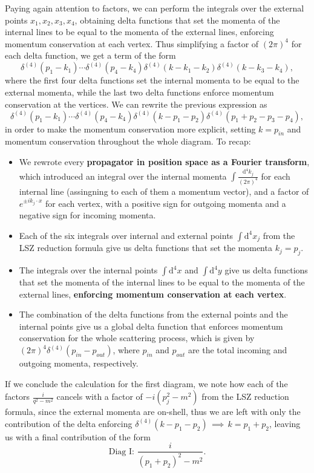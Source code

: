 Paying again attention to factors, we can perform the integrals over the external points \(x_1, x_2, x_3, x_4\), obtaining delta functions that set the momenta of the internal lines to be equal to the momenta of the external lines, enforcing momentum conservation at each vertex. Thus simplifying a factor of \((2\pi)^4\) for each delta function, we get a term of the form
\[
    \delta^{(4)}(p_1 - k_1) \cdots \delta^{(4)}(p_4 - k_4) \delta^{(4)}(k - k_1 - k_2) \delta^{(4)}(k - k_3 - k_4),
\]
where the first four delta functions set the internal momenta to be equal to the external momenta, while the last two delta functions enforce momentum conservation at the vertices. We can rewrite the previous expression as
\[
    \delta^{(4)}(p_1 - k_1) \cdots \delta^{(4)}(p_4 - k_4) \delta^{(4)}(k - p_1 - p_2) \delta^{(4)}(p_1 + p_2 - p_3 - p_4),
\]
in order to make the momentum conservation more explicit, setting \(k = p_{in}\) and momentum conservation throughout the whole diagram. To recap:
\begin{itemize}
    \item We rewrote every \textbf{propagator in position space as a Fourier transform}, which introduced an integral over the internal momenta \(\int \tfrac{\mathrm{d}^4 k_j}{(2\pi)^4}\) for each internal line (assingning to each of them a momentum vector), and a factor of \(e^{\pm i k_j \cdot x}\) for each vertex, with a positive sign for outgoing momenta and a negative sign for incoming momenta.
    \item Each of the six integrals over internal and external points \(\int \mathrm{d}^4 x_j\) from the LSZ reduction formula give us delta functions that set the momenta \(k_j = p_j\).
    \item The integrals over the internal points \(\int \mathrm{d}^4 x\) and \(\int \mathrm{d}^4 y\) give us delta functions that set the momenta of the internal lines to be equal to the momenta of the external lines, \textbf{enforcing momentum conservation at each vertex}.
    \item The combination of the delta functions from the external points and the internal points give us a global delta function that enforces momentum conservation for the whole scattering process, which is given by \((2 \pi)^4 \delta^{(4)} (p_{in} - p_{out} )\), where \(p_{in}\) and \(p_{out}\) are the total incoming and outgoing momenta, respectively.
\end{itemize}
If we conclude the calculation for the first diagram, we note how each of the factors \(\tfrac{i}{q^2 - m^2}\) cancels with a factor of \(-i(p_j^2 - m^2)\) from the LSZ reduction formula, since the external momenta are on-shell, thus we are left with only the contribution of the delta enforcing \(\delta^{(4)}(k - p_1 - p_2) \, \implies \, k = p_1 + p_2\), leaving us with a final contribution of the form
\[
    \text{Diag I: } \frac{i}{(p_1 + p_2)^{2} - m^2}.
\]

